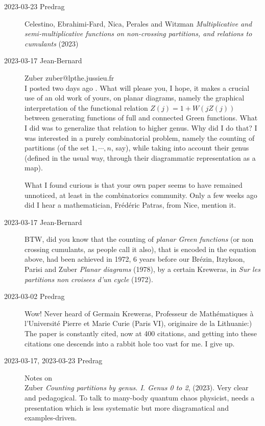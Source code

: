 \begin{description}
   \item[2023-03-23 Predrag]
Celestino, Ebrahimi-Fard, Nica, Perales and Witzman
{\em Multiplicative and semi-multiplicative functions on non-crossing
partitions, and relations to cumulants}
(2023)

   \item[2023-03-17 Jean-Bernard]
 {Zuber}
zuber@lpthe.jussieu.fr
\\
I posted two days ago . What will please you, I hope,
it makes a crucial use of an old work of yours, on planar diagrams,
namely the graphical interpretation of the functional relation
$Z(j)=1+W(j Z(j))$ between generating functions of full and connected
Green functions. What I did was to generalize  that relation to higher
genus. Why did I do that? I was interested in a  purely combinatorial
problem, namely the counting of partitions (of the set ${1,\cdots,n}$,
say), while taking into account their genus (defined in the usual way,
through their diagrammatic representation as a map).

What I found curious is that your own paper seems to have remained
unnoticed, at least in the combinatorics community. Only a few weeks ago
did I hear a mathematician, Fr{\'e}d{\'e}ric Patras, from Nice, mention
it.

   \item[2023-03-17 Jean-Bernard]
BTW, did you know that the counting of \emph{planar Green functions}
(or non crossing cumulants, as people call it also), that is encoded in
the equation above, had been achieved in 1972, 6 years before our
Br{\'e}zin, Itzykson, Parisi and Zuber
{\em Planar diagrams} (1978),
 by a certain Kreweras, in
{\em Sur les partitions non croisees d'un cycle} (1972).

   \item[2023-03-02 Predrag]
Wow! Never heard of
 {Germain
Kreweras}, Professeur de Math{\'e}matiques à l'Universit{\'e} Pierre et
Marie Curie (Paris VI), originaire de la Lithuanie:) The paper is
constantly cited, now at 400 citations, and getting into these citations
one descends into a rabbit hole too vast for me. I give up.

   \item[2023-03-17, 2023-03-23 Predrag] Notes on \\
Zuber {\em Counting partitions by genus. {I. Genus} 0 to 2},
 (2023). Very clear and pedagogical. To talk to many-body
quantum chaos physicist, needs a presentation which is less systematic but
more diagramatical and examples-driven.


\end{description}
